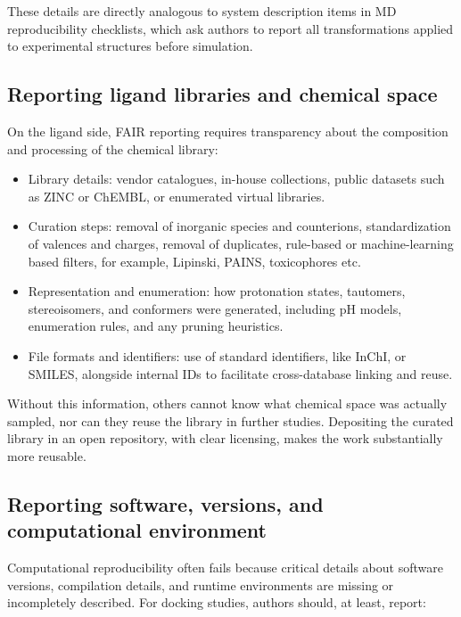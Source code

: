 \documentclass[12pt]{article}
\begin{document}
These details are directly analogous to system description items in MD reproducibility checklists, which ask authors to report all transformations applied to experimental structures before simulation.\cite{CH12_mdChecklist2023}

\subsection{Reporting ligand libraries and chemical space}

On the ligand side, FAIR reporting requires transparency about the composition and processing of the chemical library:

\begin{itemize}
  \item Library details: vendor catalogues, in-house collections, public datasets such as ZINC or ChEMBL, or enumerated virtual libraries.
  \item Curation steps: removal of inorganic species and counterions, standardization of valences and charges, removal of duplicates, rule-based or machine-learning based filters, for example, Lipinski, PAINS, toxicophores etc.
  \item Representation and enumeration: how protonation states, tautomers, stereoisomers, and conformers were generated, including pH models, enumeration rules, and any pruning heuristics.
  \item File formats and identifiers: use of standard identifiers, like InChI, or SMILES, alongside internal IDs to facilitate cross-database linking and reuse.
\end{itemize}

Without this information, others cannot know what chemical space was actually sampled, nor can they reuse the library in further studies. Depositing the curated library in an open repository, with clear licensing, makes the work substantially more reusable.\cite{CH12_uTexasRepos,CH12_aguRepos,CH12_snsfRepos}

\subsection{Reporting software, versions, and computational environment}

Computational reproducibility often fails because critical details about software versions, compilation details, and runtime environments are missing or incompletely described.\cite{CH12_toolsRepro2016,CH12_reproWorkflows2017} For docking studies, authors should, at least, report:
\end{document}
